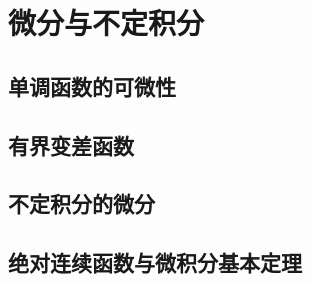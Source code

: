 \chapter{微分与不定积分}

\section{单调函数的可微性}
























%
%
\section{有界变差函数}

%
%

\section{不定积分的微分}


%
%
\section{绝对连续函数与微积分基本定理}



